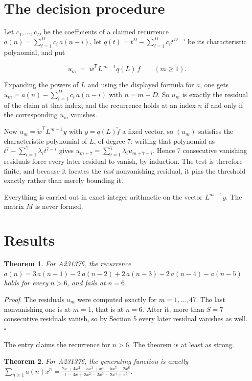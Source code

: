 \documentclass[11pt]{article}
\newtheorem{theorem}{Theorem}
\theoremstyle{definition}
\begin{document}
\section{The decision procedure}

Let $c_1,\dots,c_D$ be the coefficients of a claimed recurrence $a(n) = \sum_{i=1}^{D} c_i\,a(n-i)$, let $q(t) = t^{D} - \sum_{i=1}^{D} c_i t^{D-i}$ be its characteristic polynomial, and put

\[u_m \;=\; \tilde w^{\mathsf T} L^{\,m-1} q(L)\,\tilde f \qquad (m \ge 1).\]

Expanding the powers of $L$ and using the displayed formula for $a$, one gets $u_m = a(n) - \sum_{i=1}^{D} c_i\,a(n-i)$ with $n = m + D$. So $u_m$ is exactly the residual of the claim at that index, and the recurrence holds at an index $n$ if and only if the corresponding $u_m$ vanishes.

Now $u_m = \tilde w^{\mathsf T} L^{m-1} y$ with $y = q(L)\tilde f$ a fixed vector, so $(u_m)$ satisfies the characteristic polynomial of $L$, of degree $7$: writing that polynomial as $t^{7} - \sum_{i=1}^{7} \lambda_i t^{7-i}$ gives $u_{m+7} = \sum_{i=1}^{7} \lambda_i u_{m+7-i}$. Hence $7$ consecutive vanishing residuals force every later residual to vanish, by induction. The test is therefore finite; and because it locates the {\itshape last} nonvanishing residual, it pins the threshold exactly rather than merely bounding it.

Everything is carried out in exact integer arithmetic on the vector $L^{m-1}y$. The matrix $M$ is never formed.

\section{Results}

\begin{theorem} For A231376, the recurrence $a(n) = 3\,a(n-1) - 2\,a(n-2) + 2\,a(n-3) - 2\,a(n-4) - a(n-5)$ holds for every $n > 6$, and fails at $n = 6$.\end{theorem}

{\itshape Proof.} The residuals $u_m$ were computed exactly for $m = 1,\dots,47$. The last nonvanishing one is at $m = 1$, that is at $n = 6$. After it, more than $S = 7$ consecutive residuals vanish, so by Section 5 every later residual vanishes as well. $\square$

The entry claims the recurrence for $n > 6$. The theorem is at least as strong.

\begin{theorem} For A231376, the generating function is exactly $\sum_{n\ge 1} a(n)x^n = \frac{2x + 4x^{2} - 5x^{3} + x^{4} - 5x^{5} - 2x^{6}}{1 - 3x + 2x^{2} - 2x^{3} + 2x^{4} + x^{5}}$.\end{theorem}
\end{document}
